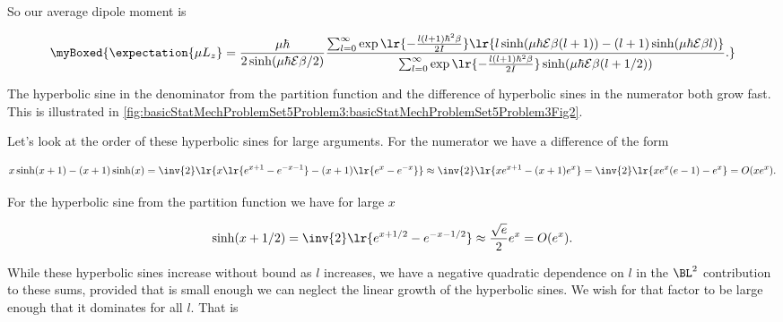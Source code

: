 {So our average dipole moment is 

\begin{equation}\label{eqn:basicStatMechProblemSet5Problem3:560}
\myBoxed{
\expectation{ \mu L_z } 
= 
\frac
{\mu \hbar }
{
2 \sinh(\mu \hbar \mathcal{E} \beta/2)
}
\frac
{
   \sum_{l = 0}^\infty \exp\lr{ -\frac{l (l+1) \hbar^2 \beta}{2 I}}
   \lr{ l \sinh(\mu \hbar \mathcal{E} \beta (l+1)) - (l+1) \sinh(\mu \hbar \mathcal{E} \beta l) }
}
{
   \sum_{l = 0}^\infty \exp\lr{ -\frac{l (l+1) \hbar^2 \beta}{2 I}} 
   \sinh(\mu \hbar \mathcal{E} \beta(l + 1/2))
}.
}
\end{equation}

The hyperbolic sine in the denominator from the partition function and the difference of hyperbolic sines in the numerator both grow fast.  This is illustrated in \cref{fig:basicStatMechProblemSet5Problem3:basicStatMechProblemSet5Problem3Fig2}.


Let's look at the order of these hyperbolic sines for large arguments.  For the numerator we have a difference of the form

\begin{dmath}\label{eqn:basicStatMechProblemSet5Problem3:580}
x \sinh( x + 1 ) - (x + 1) \sinh ( x )
= 
\inv{2} 
\lr{ 
x \lr{ e^{x + 1} - e^{-x - 1} }
-(x +1 )\lr{ e^{x } - e^{-x } }
}
\approx
\inv{2} 
\lr{ 
x e^{x + 1} 
-(x +1 ) e^{x } 
}
=
\inv{2} 
\lr{ 
x e^{x}  ( e - 1 ) - e^x
}
= O(x e^x).
\end{dmath}

For the hyperbolic sine from the partition function we have for large $x$ 

\begin{equation}\label{eqn:basicStatMechProblemSet5Problem3:600}
\sinh( x + 1/2) 
= \inv{2} \lr{e^{x + 1/2} - e^{-x - 1/2}}
\approx \frac{\sqrt{e}}{2} e^{x}
= O(e^x).
\end{equation}

%

While these hyperbolic sines increase without bound as $l$ increases, we have a negative quadratic dependence on $l$ in the $\BL^2$ contribution to these sums, provided that is small enough we can neglect the linear growth of the hyperbolic sines.  We wish for that factor to be large enough that it dominates for all $l$.  That is

}
